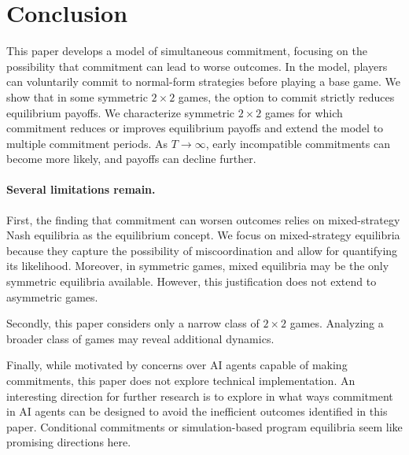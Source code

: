 \documentclass[../paper.tex]{subfiles}
\begin{document}
\section{Conclusion}\label{sec:conclusion}
This paper develops a model of simultaneous commitment, focusing on the possibility that commitment can lead to worse outcomes. In the model, players can voluntarily commit to normal-form strategies before playing a base game. We show that in some symmetric $2 \times 2$ games, the option to commit strictly reduces equilibrium payoffs. We characterize symmetric $2 \times 2$ games for which commitment reduces or improves equilibrium payoffs and extend the model to multiple commitment periods. As $T \to \infty$, early incompatible commitments can become more likely, and payoffs can decline further. 
 
\paragraph{Several limitations remain.}
First, the finding that commitment can worsen outcomes relies on mixed-strategy Nash equilibria as the equilibrium concept. We focus on mixed-strategy equilibria because they capture the possibility of miscoordination and allow for quantifying its likelihood. Moreover, in symmetric games, mixed equilibria may be the only symmetric equilibria available. However, this justification does not extend to asymmetric games.
 
Secondly, this paper considers only a narrow class of $2\times2$ games. Analyzing a broader class of games may reveal additional dynamics.
 
Finally, while motivated by concerns over AI agents capable of making commitments, this paper does not explore technical implementation. An interesting direction for further research is to explore in what ways commitment in AI agents can be designed to avoid the inefficient outcomes identified in this paper. Conditional commitments \parencite[]{kalai_commitment_2010} or simulation-based program equilibria \parencite[]{cooper_characterising_2024} seem like promising directions here. 
 
\newpage
\printbibliography
\newpage
\end{document}
